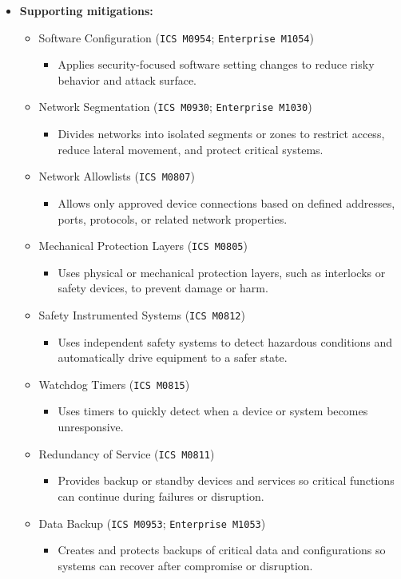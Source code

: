 \documentclass[10pt,a4paper,oneside]{report}
\begin{document}
\begin{itemize}
\item \textbf{Supporting mitigations:}
\begin{itemize}
\item Software Configuration (\texttt{ICS M0954}; \texttt{Enterprise M1054})
\begin{itemize}
\item Applies security-focused software setting changes to reduce risky behavior and attack surface.
\end{itemize}
\item Network Segmentation (\texttt{ICS M0930}; \texttt{Enterprise M1030})
\begin{itemize}
\item Divides networks into isolated segments or zones to restrict access, reduce lateral movement, and protect critical systems.
\end{itemize}
\item Network Allowlists (\texttt{ICS M0807})
\begin{itemize}
\item Allows only approved device connections based on defined addresses, ports, protocols, or related network properties.
\end{itemize}
\item Mechanical Protection Layers (\texttt{ICS M0805})
\begin{itemize}
\item Uses physical or mechanical protection layers, such as interlocks or safety devices, to prevent damage or harm.
\end{itemize}
\item Safety Instrumented Systems (\texttt{ICS M0812})
\begin{itemize}
\item Uses independent safety systems to detect hazardous conditions and automatically drive equipment to a safer state.
\end{itemize}
\item Watchdog Timers (\texttt{ICS M0815})
\begin{itemize}
\item Uses timers to quickly detect when a device or system becomes unresponsive.
\end{itemize}
\item Redundancy of Service (\texttt{ICS M0811})
\begin{itemize}
\item Provides backup or standby devices and services so critical functions can continue during failures or disruption.
\end{itemize}
\item Data Backup (\texttt{ICS M0953}; \texttt{Enterprise M1053})
\begin{itemize}
\item Creates and protects backups of critical data and configurations so systems can recover after compromise or disruption.
\end{itemize}
\end{itemize}
\end{itemize}
\end{document}
